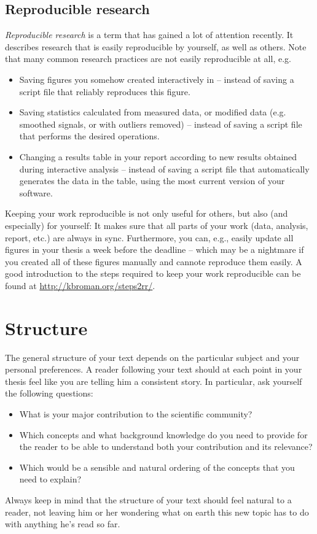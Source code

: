 \subsection{Reproducible research}
\emph{Reproducible research} is a term that has gained a lot of attention recently.
It describes research that is easily reproducible by yourself, as well as others.
Note that many common research practices are not easily reproducible at all, e.g.
\begin{itemize}
\item Saving figures you somehow created interactively in  -- instead of saving a script file that reliably reproduces this figure.
\item Saving statistics calculated from measured data, or modified data (e.g. smoothed signals, or with outliers removed) -- instead of saving a script file that performs the desired operations.
\item Changing a results table in your report according to new results obtained during interactive analysis -- instead of saving a script file that automatically generates the data in the table, using the most current version of your software.
\end{itemize}
Keeping your work reproducible is not only useful for others, but also (and especially) for yourself: It makes sure that all parts of your work (data, analysis, report, etc.) are always in sync.
Furthermore, you can, e.g., easily update all figures in your thesis a week before the deadline -- which may be a nightmare if you created all of these figures manually and cannote reproduce them easily.
A good introduction to the steps required to keep your work reproducible can be found at \url{http://kbroman.org/steps2rr/}.

\section{Structure}
The general structure of your text depends on the particular subject and your personal preferences.
A reader following your text should at each point in your thesis feel like you are telling him a consistent story.
In particular, ask yourself the following questions:
\begin{itemize}
\item What is your major contribution to the scientific community? 
\item Which concepts and what background knowledge do you need to provide for the reader to be able to understand both your contribution and its relevance?
\item Which would be a sensible and natural ordering of the concepts that you need to explain?
\end{itemize}
Always keep in mind that the structure of your text should feel natural to a reader, not leaving him or her wondering what on earth this new topic has to do with anything he's read so far.

